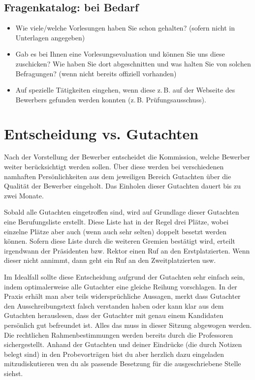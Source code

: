 \documentclass[10pt,twoside,a5paper,openright]{book}
\begin{document}
\subsection{Fragenkatalog: bei Bedarf}
\begin{itemize}
	\item Wie viele/welche Vorlesungen haben Sie schon gehalten? (sofern nicht in Unterlagen angegeben)
	\item Gab es bei Ihnen eine Vorlesungsevaluation und können Sie uns diese zuschicken? Wie haben Sie dort abgeschnitten und was halten Sie von solchen Befragungen? (wenn nicht bereits offiziell vorhanden)
	\item Auf spezielle Tätigkeiten eingehen, wenn diese z.\,B. auf der Webseite des Bewerbers gefunden werden konnten (z.\,B. Prüfungsausschuss).
\end{itemize}


\section{Entscheidung vs. Gutachten}
Nach der Vorstellung der Bewerber entscheidet die Kommission, welche Bewerber weiter berücksichtigt werden sollen. Über diese werden bei verschiedenen namhaften Persönlichkeiten aus dem jeweiligen Bereich Gutachten über die Qualität der Bewerber eingeholt. Das Einholen dieser Gutachten dauert bis zu zwei Monate. 

Sobald alle Gutachten eingetroffen sind, wird auf Grundlage dieser Gutachten eine Berufungsliste erstellt. Diese Liste hat in der Regel drei Plätze, wobei einzelne Plätze aber auch (wenn auch sehr selten) doppelt besetzt werden können. Sofern diese Liste durch die weiteren Gremien bestätigt wird, erteilt irgendwann der Präsidenten bzw. Rektor einen Ruf an den Erstplatzierten. Wenn dieser nicht annimmt, dann geht ein Ruf an den Zweitplatzierten usw.

Im Idealfall sollte diese Entscheidung aufgrund der Gutachten sehr einfach sein, indem optimalerweise alle Gutachter eine gleiche Reihung vorschlagen. In der Praxis erhält man aber teils widersprüchliche Aussagen, merkt dass Gutachter den Ausschreibungstext falsch verstanden haben oder kann klar aus dem Gutachten herauslesen, dass der Gutachter mit genau einem Kandidaten persönlich gut befreundet ist. Alles das muss in dieser Sitzung abgewogen werden. Die rechtlichen Rahmenbestimmungen werden bereits durch die Professoren sichergestellt. Anhand der Gutachten und deiner Eindrücke (die durch Notizen belegt sind) in den Probevorträgen bist du aber herzlich dazu eingeladen mitzudiskutieren wen du als passende Besetzung für die ausgeschriebene Stelle siehst.
\end{document}
